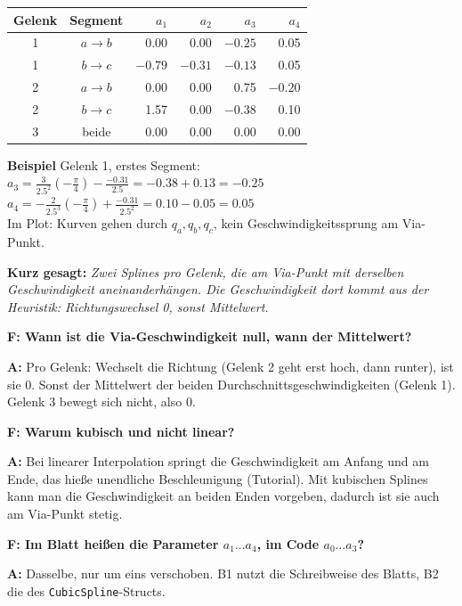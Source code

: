 \documentclass[10pt,a4paper]{article}
\newcommand{\frage}[2]{\textbf{F: #1}\par\nopagebreak\vspace{1pt}\textbf{A:} #2\par\vspace{5pt}}
\newcommand{\sagen}[1]{\textbf{Kurz gesagt:} \emph{#1}\par}
\newcommand{\code}[1]{\texttt{#1}}
\begin{document}
\begin{minipage}[c]{0.5\textwidth}
{\small
\begin{tabular}{ccrrrr}
  \toprule
  Gelenk & Segment & $a_1$ & $a_2$ & $a_3$ & $a_4$ \\
  \midrule
  1 & $a \to b$ & 0.00    & 0.00    & $-0.25$ & 0.05 \\
  1 & $b \to c$ & $-0.79$ & $-0.31$ & $-0.13$ & 0.05 \\
  2 & $a \to b$ & 0.00    & 0.00    & 0.75    & $-0.20$ \\
  2 & $b \to c$ & 1.57    & 0.00    & $-0.38$ & 0.10 \\
  3 & beide     & 0.00    & 0.00    & 0.00    & 0.00 \\
  \bottomrule
\end{tabular}
}
\end{minipage}\hfill
\begin{minipage}[c]{0.47\textwidth}
\textbf{Beispiel} Gelenk 1, erstes Segment:\\
$a_3 = \frac{3}{2.5^2}(-\frac{\pi}{4}) - \frac{-0.31}{2.5} = -0.38 + 0.13 = -0.25$\\
$a_4 = -\frac{2}{2.5^3}(-\frac{\pi}{4}) + \frac{-0.31}{2.5^2} = 0.10 - 0.05 = 0.05$\\
Im Plot: Kurven gehen durch $q_a, q_b, q_c$, kein Geschwindigkeitssprung am Via-Punkt.
\end{minipage}

\sagen{Zwei Splines pro Gelenk, die am Via-Punkt mit derselben Geschwindigkeit aneinanderhängen. Die Geschwindigkeit dort
kommt aus der Heuristik: Richtungswechsel 0, sonst Mittelwert.}

\begin{fragen}
\frage{Wann ist die Via-Geschwindigkeit null, wann der Mittelwert?}
{Pro Gelenk: Wechselt die Richtung (Gelenk 2 geht erst hoch, dann runter), ist sie 0. Sonst der Mittelwert der beiden
Durchschnittsgeschwindigkeiten (Gelenk 1). Gelenk 3 bewegt sich nicht, also 0.}
\frage{Warum kubisch und nicht linear?}
{Bei linearer Interpolation springt die Geschwindigkeit am Anfang und am Ende, das hieße unendliche Beschleunigung
(Tutorial). Mit kubischen Splines kann man die Geschwindigkeit an beiden Enden vorgeben, dadurch ist sie auch am Via-Punkt
stetig.}
\frage{Im Blatt heißen die Parameter $a_1 \ldots a_4$, im Code $a_0 \ldots a_3$?}
{Dasselbe, nur um eins verschoben. B1 nutzt die Schreibweise des Blatts, B2 die des \code{CubicSpline}-Structs.}
\end{fragen}

\end{document}
